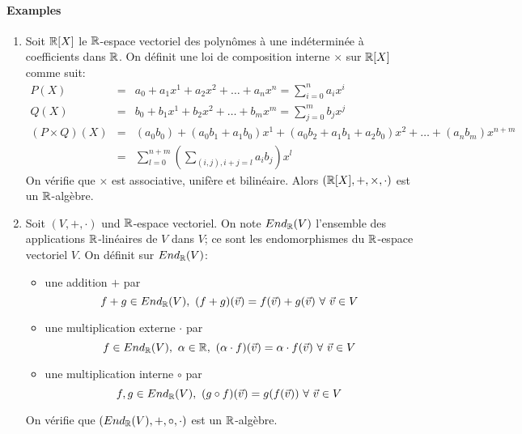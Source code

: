 \paragraph{Examples}
\begin{enumerate}[1)]
  \item Soit $\mathbb{R}[X]$ le $\mathbb{R}$-espace vectoriel des polynômes à une indéterminée à  coefficients dans $\mathbb{R}$. On définit une loi de composition interne $\times$ sur $\mathbb{R}[X]$ comme suit:
    \begin{eqnarray*}
      P(X) &=& a_0 + a_1 x^1 + a_2 x^2 + \ldots + a_n x^n = \sum_{i=0}^{n} a_i x^i \\
      Q(X) &=& b_0 + b_1 x^1 + b_2 x^2 + \ldots + b_m x^m = \sum_{j=0}^{m} b_j x^j \\
      (P \times Q)(X) &=& (a_0 b_0) + (a_0 b_1 + a_1 b_0) x^1 + (a_0 b_2 + a_1 b_1 + a_2 b_0) x^2 + \ldots + (a_n b_m) x^{n+m} \\
        &=& \sum_{l=0}^{n+m} \left ( \sum_{(i, j), i+j=l} a_i b_j \right ) x^l
    \end{eqnarray*}
    On vérifie que $\times$ est associative, unifère et bilinéaire. Alors $(\mathbb{R}[X], + , \times, \cdot)$ est un $\mathbb{R}$-algèbre.
    
  \item Soit $(V, +, \cdot)$ und $\mathbb{R}$-espace vectoriel. On note $End_{\mathbb{R}}(V)$ l'ensemble des applications $\mathbb{R}$-linéaires de $V$ dans $V$; ce sont les endomorphismes du $\mathbb{R}$-espace vectoriel $V$. On définit sur $End_{\mathbb{R}}(V)$:
    \begin{itemize}
      \item une addition $+$ par
        $$f+g \in End_{\mathbb{R}}(V), ~ (f+g)(\vec{v}) = f(\vec{v}) + g(\vec{v}) ~ \forall ~ \vec{v} \in V$$
      \item une multiplication externe $\cdot$ par
        $$f \in End_{\mathbb{R}}(V), ~ \alpha \in \mathbb{R}, ~ (\alpha \cdot f)(\vec{v}) = \alpha \cdot f(\vec{v}) ~ \forall ~ \vec{v} \in V$$
      \item une multiplication interne $\circ$ par
        $$f, g \in End_{\mathbb{R}}(V), ~ (g \circ f)(\vec{v}) = g(f(\vec{v})) ~ \forall ~ \vec{v} \in V$$
    \end{itemize} 
    On vérifie que $(End_{\mathbb{R}}(V), +, \circ, \cdot)$ est un $\mathbb{R}$-algèbre.
\end{enumerate}
